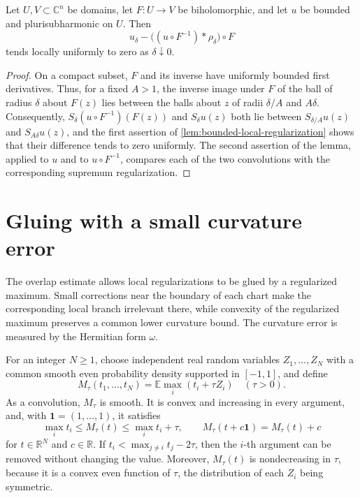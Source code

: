 \begin{corollary}\label{cor:coordinate-convolution}
Let $U,V\subset\mathbb C^n$ be domains, let $F\colon U\to V$ be biholomorphic, and let $u$ be bounded and plurisubharmonic on $U$. Then
\[
 u_\delta-\bigl((u\circ F^{-1})*\rho_\delta\bigr)\circ F
\]
tends locally uniformly to zero as $\delta\downarrow0$.
\end{corollary}
\begin{proof}
On a compact subset, $F$ and its inverse have uniformly bounded first derivatives. Thus, for a fixed $A>1$, the inverse image under $F$ of the ball of radius $\delta$ about $F(z)$ lies between the balls about $z$ of radii $\delta/A$ and $A\delta$. Consequently, $S_\delta(u\circ F^{-1})(F(z))$ and $S_\delta u(z)$ both lie between $S_{\delta/A}u(z)$ and $S_{A\delta}u(z)$, and the first assertion of \cref{lem:bounded-local-regularization} shows that their difference tends to zero uniformly. The second assertion of the lemma, applied to $u$ and to $u\circ F^{-1}$, compares each of the two convolutions with the corresponding supremum regularization.
\end{proof}

\section{Gluing with a small curvature error}

The overlap estimate allows local regularizations to be glued by a regularized maximum. Small corrections near the boundary of each chart make the corresponding local branch irrelevant there, while convexity of the regularized maximum preserves a common lower curvature bound. The curvature error is measured by the Hermitian form $\omega$.

For an integer $N\geq1$, choose independent real random variables $Z_1,\ldots,Z_N$ with a common smooth even probability density supported in $[-1,1]$, and define
\[
 M_\tau(t_1,\ldots,t_N)
     =\mathbb E\max_i(t_i+\tau Z_i)\quad(\tau>0).
\]
As a convolution, $M_\tau$ is smooth. It is convex and increasing in every argument, and, with $\mathbf1=(1,\ldots,1)$, it satisfies
\[
 \max_i t_i\leq M_\tau(t)\leq\max_i t_i+\tau,
 \qquad M_\tau(t+c\mathbf1)=M_\tau(t)+c
\]
for $t\in\mathbb R^N$ and $c\in\mathbb R$. If $t_i<\max_{j\ne i}t_j-2\tau$, then the $i$-th argument can be removed without changing the value. Moreover, $M_\tau(t)$ is nondecreasing in $\tau$, because it is a convex even function of $\tau$, the distribution of each $Z_i$ being symmetric.


